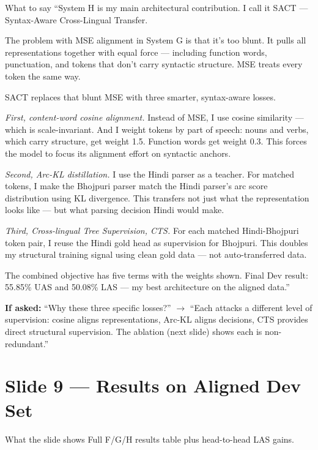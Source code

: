 \documentclass[11pt]{article}
\begin{document}
\begin{pitchbox}{What to say}
``System H is my main architectural contribution. I call it SACT --- Syntax-Aware Cross-Lingual Transfer.

The problem with MSE alignment in System G is that it's too blunt. It pulls all representations together with equal force --- including function words, punctuation, and tokens that don't carry syntactic structure. MSE treats every token the same way.

SACT replaces that blunt MSE with three smarter, syntax-aware losses.

\textit{First, content-word cosine alignment.} Instead of MSE, I use cosine similarity --- which is scale-invariant. And I weight tokens by part of speech: nouns and verbs, which carry structure, get weight 1.5. Function words get weight 0.3. This forces the model to focus its alignment effort on syntactic anchors.

\textit{Second, Arc-KL distillation.} I use the Hindi parser as a teacher. For matched tokens, I make the Bhojpuri parser match the Hindi parser's arc score distribution using KL divergence. This transfers not just what the representation looks like --- but what parsing decision Hindi would make.

\textit{Third, Cross-lingual Tree Supervision, CTS.} For each matched Hindi-Bhojpuri token pair, I reuse the Hindi gold head as supervision for Bhojpuri. This doubles my structural training signal using clean gold data --- not auto-transferred data.

The combined objective has five terms with the weights shown. Final Dev result: 55.85\% UAS and 50.08\% LAS --- my best architecture on the aligned data.''
\end{pitchbox}

\begin{tipbox}
\textbf{If asked:} ``Why these three specific losses?'' $\to$ ``Each attacks a different level of supervision: cosine aligns representations, Arc-KL aligns decisions, CTS provides direct structural supervision. The ablation (next slide) shows each is non-redundant.''
\end{tipbox}

\section{Slide 9 --- Results on Aligned Dev Set}

\begin{pitchbox}{What the slide shows}
Full F/G/H results table plus head-to-head LAS gains.
\end{pitchbox}
\end{document}
